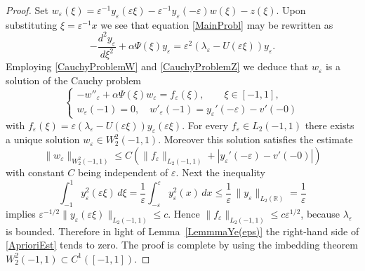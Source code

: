 \documentclass[11pt,english]{amsart}
\begin{document}
\begin{proof}
Set $w_\varepsilon(\xi)=\varepsilon^{-1}y_\varepsilon(\varepsilon\xi)
-\varepsilon^{-1}y_\varepsilon(-\varepsilon)w(\xi)- z(\xi)$.
Upon substituting $\xi=\varepsilon^{-1}x$ we see that equation \eqref{MainProbl} may be rewritten as
\begin{equation*}
    -\frac{d^2y_\varepsilon}{d\xi^2}+\alpha\Psi(\xi)y_\varepsilon=\varepsilon^2 (\lambda_\varepsilon-U(\varepsilon\xi))y_\varepsilon.
  \end{equation*}
Employing \eqref{CauchyProblemW} and \eqref{CauchyProblemZ} we deduce that $w_\varepsilon$ is a solution of the Cauchy problem
  \begin{equation}\label{CauchyProblemWe}
    \begin{cases}
    -w''_\varepsilon+\alpha\Psi(\xi) w_\varepsilon=f_\varepsilon(\xi),\qquad \xi\in[-1,1],\\
    w_\varepsilon(-1)=0,\quad     w'_\varepsilon(-1)=y_\varepsilon'(-\varepsilon)-v'(-0)
    \end{cases}
\end{equation}
with $f_\varepsilon(\xi)=\varepsilon(\lambda_\varepsilon-U(\varepsilon\xi))y_\varepsilon(\varepsilon\xi)$. For every $f_\varepsilon\in L_2(-1,1)$ there exists a unique solution $w_\varepsilon\in W_2^2(-1,1)$. Moreover this solution satisfies the estimate
\begin{equation}\label{AprioriEst}
    \|w_\varepsilon\|_{W_2^2(-1,1)}\leq C\left(\|f_\varepsilon\|_{L_2(-1,1)}+|y_\varepsilon'(-\varepsilon)-v'(-0)|\right)
\end{equation}
with constant $C$ being independent of $\varepsilon$. Next the inequality
\begin{equation*}
    \int_{-1}^1y_\varepsilon^2(\varepsilon\xi)\,d\xi=\frac{1}{\varepsilon}\int_{-\varepsilon}^\varepsilon y_\varepsilon^2(x)\,dx\leq \frac{1}{\varepsilon}\,\|y_\varepsilon\|_{L_2(\mathbb{R})}=\frac{1}{\varepsilon}
\end{equation*}
implies $\varepsilon^{-1/2}\|y_\varepsilon(\varepsilon\xi)\|_{L_2(-1,1)}\leq c$. Hence $\|f_\varepsilon\|_{L_2(-1,1)}\leq c \varepsilon^{1/2}$, because $\lambda_\varepsilon$ is bounded.
Therefore in light of Lemma~\ref{LemmmaYe(eps)} the right-hand side of \eqref{AprioriEst} tends to zero.
The proof is complete by using the imbedding theorem $W_2^2(-1,1)\subset C^1([-1,1])$.
\end{proof}
\end{document}
